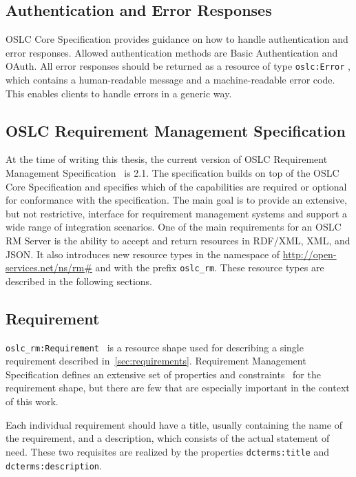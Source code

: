 \subsection*{Authentication and Error Responses}
OSLC Core Specification provides guidance on how to handle authentication and error responses. Allowed authentication methods are Basic Authentication and OAuth. All error responses should be returned as a resource of type \texttt{oslc:Error} \cite{oslc_core_error}, which contains a human-readable message and a machine-readable error code. This enables clients to handle errors in a generic way.

\subsection{OSLC Requirement Management Specification}
\label{sec:oslc_rm_specification}
At the time of writing this thesis, the current version of OSLC Requirement Management Specification \cite{oslc_requirement_management_specification} is 2.1. The specification builds on top of the OSLC Core Specification and specifies which of the capabilities are required or optional for conformance with the specification. The main goal is to provide an extensive, but not restrictive, interface for requirement management systems and support a wide range of integration scenarios. One of the main requirements for an OSLC RM Server is the ability to accept and return resources in RDF/XML, XML, and JSON. It also introduces new resource types in the namespace of \url{http://open-services.net/ns/rm\#} and with the prefix \texttt{oslc\_rm}. These resource types are described in the following sections.

\subsection*{Requirement}
\texttt{oslc\_rm:Requirement} \cite{oslc_rm_requirement} is a resource shape used for describing a single requirement described in \ref{sec:requirements}. Requirement Management Specification defines an extensive set of properties and constraints \cite{oslc_rm_requirement_constraints} for the requirement shape, but there are few that are especially important in the context of this work.

Each individual requirement should have a title, usually containing the name of the requirement, and a description, which consists of the actual statement of need. These two requisites are realized by the properties \texttt{dcterms:title} and \texttt{dcterms:description}.

